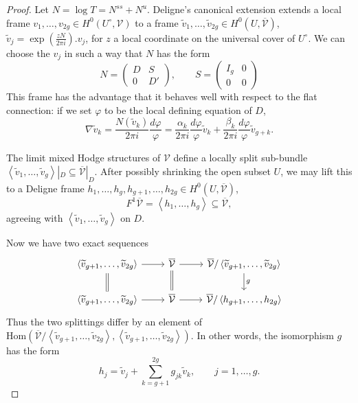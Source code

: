 \documentclass[12pt]{amsart}
\newcommand{\Hom}{\mathrm{Hom}}
\newcommand{\cV}{\mathcal{V}}
\newcommand{\ol}{\overline}
\newcommand{\wt}{\widetilde}
\theoremstyle{definition}
\numberwithin{equation}{section}
\begin{document}
\begin{proof}
Let \(N = \log T = N^{ss} + N^u\). Deligne's canonical extension extends a local frame 
\(v_1, \dots, v_{2g} \in H^0(U^\circ, \cV)\) to a frame 
\(\wt{v}_1, \dots, \wt{v}_{2g} \in H^0(U, \ol{\cV})\), 
\(\wt{v}_j = \exp(\frac{zN}{2\pi i}). v_j\), for \(z\) a local coordinate on the 
universal cover of \(U^\circ\). We can choose the \(v_j\) in such a way that \(N\) 
has the form 
\begin{equation*}
    N = \begin{pmatrix}
        D & S \\ 0 & D'
    \end{pmatrix},\qquad S = \begin{pmatrix}
        I_g & 0 \\ 0 & 0
    \end{pmatrix}
\end{equation*}
This frame has the advantage that it behaves well with respect to the flat connection:
if we set \(\varphi\) to be the local defining equation of \(D\), 
\begin{equation*}
    \nabla \wt{v}_k = \frac{N(\wt{v}_k)}{2\pi i} \frac{d\varphi}{\varphi}
    = \frac{\alpha_k}{2\pi i} \frac{d\varphi}{\varphi} \wt{v}_k + \frac{\beta_k}{2\pi i} \frac{d\varphi}{\varphi} \wt{v}_{g+k}.
\end{equation*}

The limit mixed Hodge structures of \(\cV\) define a locally split 
sub-bundle \(\left<\wt{v}_1, \dots, \wt{v}_g\right>|_D \subseteq \ol{\cV}|_D\).
After possibly shrinking the open subset \(U\), we may lift this to a Deligne frame 
\(h_1, \dots, h_g, h_{g+1}, \dots, h_{2g} \in H^0(U, \ol{\cV})\), 
\begin{equation*}
    F^1 \ol{\cV} = \left<h_1, \dots, h_g \right> \subseteq \ol{\cV},
\end{equation*}
agreeing with \(\left<\wt{v}_1, \dots, \wt{v}_g\right>\) on \(D\).

Now we have two exact sequences 
\begin{equation*}
\begin{tikzcd}
\left< \wt{v}_{g+1}, \dots, \wt{v}_{2g} \right> \arrow{r} \arrow[equal]{d} & \ol{\cV} \arrow{r} \arrow[equal]{d} & \ol{\cV} / \left< \wt{v}_{g+1}, \dots, \wt{v}_{2g} \right> \arrow{d}{g} \\
\left< \wt{v}_{g+1}, \dots, \wt{v}_{2g} \right> \arrow{r} & \ol{\cV}  \arrow{r} & \ol{\cV} / \left< h_{g+1}, \dots, h_{2g} \right>
\end{tikzcd}
\end{equation*}
Thus the two splittings differ by an element of 
\(\Hom(\ol{\cV} / \left< \wt{v}_{g+1}, \dots, \wt{v}_{2g} \right>, \left< \wt{v}_{g+1}, \dots, \wt{v}_{2g} \right>)\).
In other words, the isomorphism \(g\) has the form
\begin{equation*}
    h_j = \wt{v}_j + \sum_{k=g+1}^{2g} g_{jk} \wt{v}_k,\qquad j = 1,\dots, g.
\end{equation*}


\end{proof}
\end{document}
